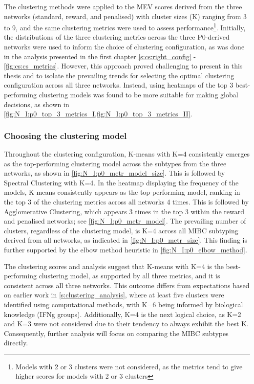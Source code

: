 The clustering methods were applied to the MEV scores derived from the three networks (standard, reward, and penalised) with cluster sizes (K) ranging from 3 to 9, and the same clustering metrics were used to assess performance\footnote{Models with 2 or 3 clusters were not considered, as the metrics tend to give higher scores for models with 2 or 3 clusters}. Initially, the distributions of the three clustering metrics across the three P0-derived networks were used to inform the choice of clustering configuration, as was done in the analysis presented in the first chapter \cref{s:cs:right_config} - \cref{fig:cs:cs_metrics}. However, this approach proved challenging to present in this thesis and to isolate the prevailing trends for selecting the optimal clustering configuration across all three networks. Instead, using heatmaps of the top 3 best-performing clustering models was found to be more suitable for making global decisions, as shown in \cref{fig:N_I:p0_top_3_metrics_I,fig:N_I:p0_top_3_metrics_II}.

\subsubsection{Choosing the clustering model} \label{s:ap:p0_clustering}

Throughout the clustering configuration, K-means with K=4 consistently emerges as the top-performing clustering model across the subtypes from the three networks, as shown in \cref{fig:N_I:p0_metr_model_size}. This is followed by Spectral Clustering with K=4. In the heatmap displaying the frequency of the models, K-means consistently appears as the top-performing model, ranking in the top 3 of the clustering metrics across all networks 4 times. This is followed by Agglomerative Clustering, which appears 3 times in the top 3 within the reward and penalised networks; see \cref{fig:N_I:p0_metr_model}. The prevailing number of clusters, regardless of the clustering model, is K=4 across all MIBC subtyping derived from all networks, as indicated in \cref{fig:N_I:p0_metr_size}. This finding is further supported by the elbow method heuristic in \cref{fig:N_I:p0_elbow_method}.

The clustering scores and analysis suggest that K-means with K=4 is the best-performing clustering model, as supported by all three metrics, and it is consistent across all three networks. This outcome differs from expectations based on earlier work in \cref{s:clustering_analysis}, where at least five clusters were identified using computational methods, with K=6 being informed by biological knowledge (IFNg groups). Additionally, K=4 is the next logical choice, as K=2 and K=3 were not considered due to their tendency to always exhibit the best K. Consequently, further analysis will focus on comparing the MIBC subtypes directly.



